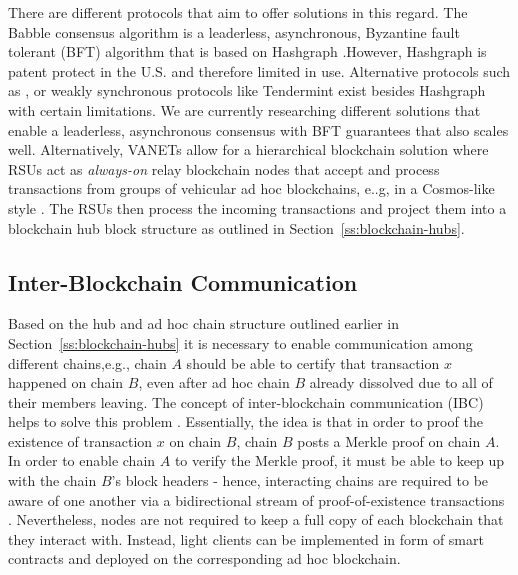 \documentclass{llncs}
\begin{document}
{			There are different protocols that aim to offer solutions in this regard. The Babble consensus algorithm \cite{babbleConsensus} is a leaderless, asynchronous, Byzantine fault tolerant (BFT) algorithm that is based on Hashgraph \cite{hashgraphWhitepaper}.However, Hashgraph is patent protect in the U.S. and therefore limited in use. Alternative protocols such as \cite{miller2016honey}, or weakly synchronous protocols like Tendermint \cite{tendermint} exist besides Hashgraph with certain limitations. We are currently researching different solutions that enable a leaderless, asynchronous consensus with BFT guarantees that also scales well. Alternatively, VANETs allow for a hierarchical blockchain solution where RSUs act as \textit{always-on} relay blockchain nodes that accept and process transactions from groups of vehicular ad hoc blockchains, e..g, in a Cosmos-like style \cite{cosmosWhitepaper}. The RSUs then process the incoming transactions and project them into a blockchain hub block structure as outlined in Section~\ref{ss:blockchain-hubs}.
		
				
		\subsection{Inter-Blockchain Communication}
			\label{ss:inter-blockchain-communication}
			
			Based on the hub and ad hoc chain structure outlined earlier in Section~\ref{ss:blockchain-hubs} it is necessary to enable communication among different chains,e.g., chain $A$ should be able to certify that transaction $x$ happened on chain $B$, even after ad hoc chain $B$ already dissolved due to all of their members leaving. The concept of inter-blockchain communication (IBC) helps to solve this problem \cite{monetWhitepaper}\cite{chen2017inter}\cite{cosmosWhitepaper}. Essentially, the idea is that in order to proof the existence of transaction $x$ on chain $B$, chain $B$ posts a Merkle proof on chain $A$. In order to enable chain $A$ to verify the Merkle proof, it must be able to keep up with the chain $B$'s block headers - hence, interacting chains are required to be aware of one another via a bidirectional stream of proof-of-existence transactions \cite{cosmosWhitepaper}. Nevertheless, nodes are not required to keep a full copy of each blockchain that they interact with. Instead, light clients can be implemented in form of smart contracts and deployed on the corresponding ad hoc blockchain.	

}
\end{document}
